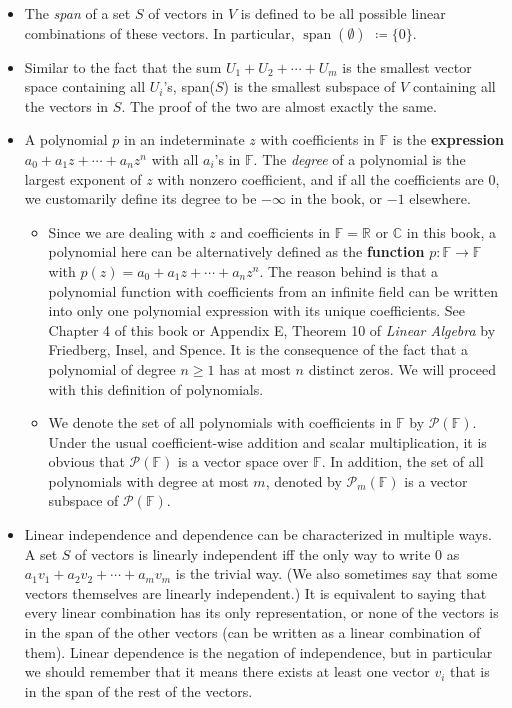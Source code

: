 \documentclass{article}
\newcommand{\R}{\mathbb{R}}
\newcommand{\C}{\mathbb{C}}
\newcommand{\F}{\mathbb{F}}
\newcommand{\s}{\operatorname{span}}
\begin{document}
\begin{itemize}
    \item The \textit{span} of a set $S$ of vectors in $V$ is defined to be all possible linear combinations of these vectors. In particular, $\s(\emptyset)$ $\coloneqq \{0\}$.
    \item Similar to the fact that the sum $U_1 + U_2 +\cdots+ U_m$ is the smallest vector space containing all $U_i$'s, span($S$) is the smallest subspace of $V$ containing all the vectors in $S$. The proof of the two are almost exactly the same.
    \item A polynomial $p$ in an indeterminate $z$ with coefficients in $\F$ is the \textbf{expression} $a_0 + a_1 z + \cdots + a_n z^n$ with all $a_i$'s in $\F$. The \textit{degree} of a polynomial is the largest exponent of $z$ with nonzero coefficient, and if all the coefficients are 0, we customarily define its degree to be $-\infty$ in the book, or $-1$ elsewhere.
    \begin{itemize}
        \item Since we are dealing with $z$ and coefficients in $\F = \R$ or $\C$ in this book, a polynomial here can be alternatively defined as the \textbf{function} $p: \F \rightarrow \F$ with $p(z) = a_0 + a_1 z + \cdots + a_n z^n$. The reason behind is that a polynomial function with coefficients from an infinite field can be written into only one polynomial expression with its unique coefficients. See Chapter 4 of this book or Appendix E, Theorem 10 of \textit{Linear Algebra} by Friedberg, Insel, and Spence. It is the consequence of the fact that a polynomial of degree $n \geq 1$ has at most $n$ distinct zeros. We will proceed with this definition of polynomials.
        \item We denote the set of all polynomials with coefficients in $\F$ by $\mathcal{P}(\F)$. Under the usual coefficient-wise addition and scalar multiplication, it is obvious that $\mathcal{P}(\F)$ is a vector space over $\F$. In addition, the set of all polynomials with degree at most $m$, denoted by $\mathcal{P}_m(\F)$ is a vector subspace of $\mathcal{P}(\F)$.
    \end{itemize}
    \item Linear independence and dependence can be characterized in multiple ways. A set $S$ of vectors is linearly independent iff the only way to write 0 as $a_1v_1 + a_2v_2 + \cdots +a_mv_m$ is the trivial way. (We also sometimes say that some vectors themselves are linearly independent.) It is equivalent to saying that every linear combination has its only representation, or none of the vectors is in the span of the other vectors (can be written as a linear combination of them). Linear dependence is the negation of independence, but in particular we should remember that it means there exists at least one vector $v_i$ that is in the span of the rest of the vectors.

\end{itemize}
\end{document}
